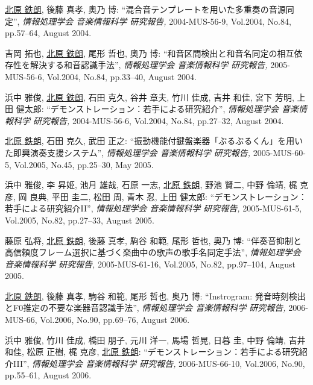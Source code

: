 \begin{Enumerate}
\item 
\underline{北原 鉄朗}, 
後藤 真孝, 
奥乃 博: 
    ``混合音テンプレートを用いた多重奏の音源同定'', 
    {\it 情報処理学会 音楽情報科学 研究報告,} 2004-MUS-56-9, Vol.2004, No.84, pp.57--64, August 2004. 

\item 
吉岡 拓也, 
\underline{北原 鉄朗}, 
尾形 哲也, 
奥乃 博: 
    ``和音区間検出と和音名同定の相互依存性を解決する和音認識手法'', 
    {\it 情報処理学会 音楽情報科学 研究報告,} 2005-MUS-56-6, Vol.2004, No.84, pp.33--40, August 2004. 

\item 
浜中 雅俊, 
\underline{北原 鉄朗}, 
石田 克久, 
谷井 章夫, 
竹川 佳成, 
吉井 和佳, 
宮下 芳明, 
上 田 健太郎: 
    ``デモンストレーション：若手による研究紹介'', 
    {\it 情報処理学会 音楽情報科学 研究報告,} 2004-MUS-56-6, Vol.2004, No.84, pp.27--32, August 2004. 

\item 
\underline{北原 鉄朗}, 
石田 克久, 
武田 正之: 
    ``振動機能付鍵盤楽器「ぶるぶるくん」を用いた即興演奏支援システム'', 
    {\it 情報処理学会 音楽情報科学 研究報告,} 2005-MUS-60-5, Vol.2005, No.45, pp.25--30, May 2005. 

\item 
浜中 雅俊, 
李 昇姫, 
池月 雄哉, 
石原 一志, 
\underline{北原 鉄朗}, 
野池 賢二, 
中野 倫靖, 
梶 克彦, 
岡 良典, 
平田 圭二, 
松田 周, 
青木 忍, 
上田 健太郎: 
    ``デモンストレーション：若手による研究紹介II'', 
    {\it 情報処理学会 音楽情報科学 研究報告,} 2005-MUS-61-5, Vol.2005, No.82, pp.27--33, August 2005. 

\item 
藤原
      弘将, 
\underline{北原 鉄朗}, 
後藤
      真孝, 
駒谷
      和範, 
尾形 哲也, 
奥乃 博: 
    ``伴奏音抑制と高信頼度フレーム選択に基づく楽曲中の歌声の歌手名同定手法'', 
    {\it 情報処理学会 音楽情報科学 研究報告,} 2005-MUS-61-16, Vol.2005, No.82, pp.97--104, August 2005. 

\item 
\underline{北原 鉄朗}, 
後藤
      真孝, 
駒谷
      和範, 
尾形 哲也, 
奥乃 博: 
    ``Instrogram: 発音時刻検出とF0推定の不要な楽器音認識手法'', 
    {\it 情報処理学会 音楽情報科学 研究報告,} 2006-MUS-66, Vol.2006, No.90, pp.69--76, August 2006. 

\item 
浜中 雅俊, 
竹川 佳成, 
橋田 朋子, 
元川 洋一, 
馬場 哲晃, 
日暮 圭, 
 中野 倫靖, 
吉井 和佳, 
松原 正樹, 
梶 克彦, 
\underline{北原 鉄朗}: 
    ``デモンストレーション：若手による研究紹介III'', 
    {\it 情報処理学会 音楽情報科学 研究報告,} 2006-MUS-66-10, Vol.2006, No.90, pp.55--61, August 2006. 


\end{Enumerate}
